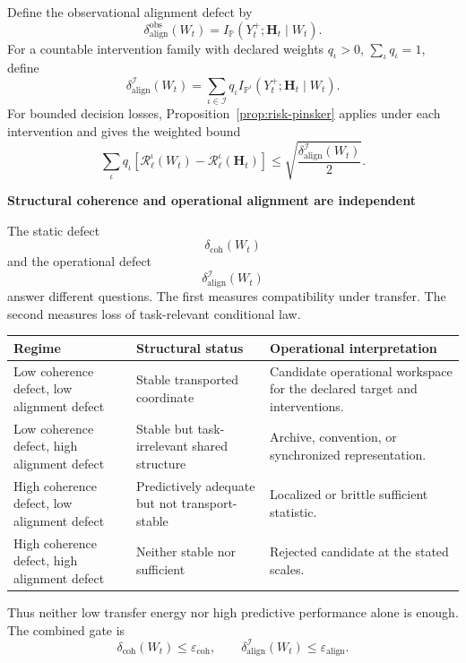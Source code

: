 \documentclass[11pt,letterpaper]{article}
\newcommand{\Risk}{\mathcal R}
\newcommand{\subtopic}[1]{%
 \vspace{0.45em}
 {\bfseries\color{AccentColor} #1\par}
}
\theoremstyle{plain}
\theoremstyle{definition}
\begin{document}
Define the observational alignment defect by
\[
\boxed{
\delta_{\mathrm{align}}^{\mathrm{obs}}(W_t)
=
I_{\mathbb P}(Y_t^+;\mathbf H_t\mid W_t).
}
\]
For a countable intervention family with declared weights
\(q_\iota>0\), \(\sum_\iota q_\iota=1\), define
\[
\boxed{
\delta_{\mathrm{align}}^{\mathcal I}(W_t)
=
\sum_{\iota\in\mathcal I}
q_\iota
I_{\mathbb P^\iota}
(Y_t^+;\mathbf H_t\mid W_t).
}
\]
For bounded decision losses, Proposition~\ref{prop:risk-pinsker} applies under
each intervention and gives the weighted bound
\[
\sum_{\iota}q_\iota
\left[
\Risk_\ell^{\iota}(W_t)
-
\Risk_\ell^{\iota}(\mathbf H_t)
\right]
\leq
\sqrt{\frac{
\delta_{\mathrm{align}}^{\mathcal I}(W_t)}{2}}.
\]

\subtopic{Structural coherence and operational alignment are independent}

The static defect
\[
\delta_{\mathrm{coh}}(W_t)
\]
and the operational defect
\[
\delta_{\mathrm{align}}^{\mathcal I}(W_t)
\]
answer different questions. The first measures compatibility under transfer.
The second measures loss of task-relevant conditional law.

\begin{center}
\small
\begin{tabularx}{\textwidth}{@{}>{\raggedright\arraybackslash}p{}>{\raggedright\arraybackslash}p{}>{\raggedright\arraybackslash}X@{}}
\toprule
Regime & Structural status & Operational interpretation \\
\midrule
Low coherence defect, low alignment defect & Stable transported coordinate &
Candidate operational workspace for the declared target and interventions. \\
Low coherence defect, high alignment defect & Stable but task-irrelevant
shared structure & Archive, convention, or synchronized representation. \\
High coherence defect, low alignment defect & Predictively adequate but not
transport-stable & Localized or brittle sufficient statistic. \\
High coherence defect, high alignment defect & Neither stable nor sufficient &
Rejected candidate at the stated scales. \\
\bottomrule
\end{tabularx}
\end{center}

Thus neither low transfer energy nor high predictive performance alone is
enough. The combined gate is
\[
\boxed{
\delta_{\mathrm{coh}}(W_t)
\leq
\varepsilon_{\mathrm{coh}},
\qquad
\delta_{\mathrm{align}}^{\mathcal I}(W_t)
\leq
\varepsilon_{\mathrm{align}}.
}
\]
\end{document}
